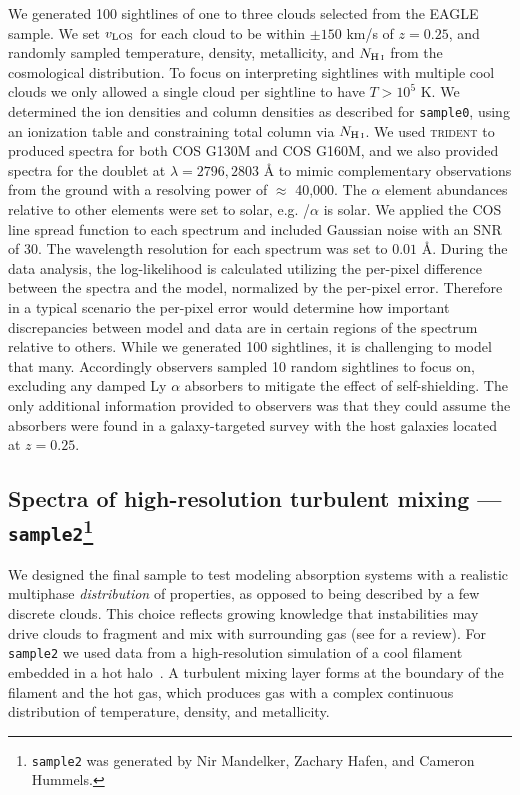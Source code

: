 \documentclass[fleqn,usenatbib]{mnras}
\begin{document}
We generated 100 sightlines of one to three clouds selected from the EAGLE sample.
We set $v_{\rm LOS}$ for each cloud to be within $\pm150$ km/s of $z=0.25$, and randomly sampled temperature, density, metallicity, and $N_{\ion{H}{I}}$ from the cosmological distribution.
To focus on interpreting sightlines with multiple cool clouds we only allowed a single cloud per sightline to have $T>10^5$ K.
We determined the ion densities and column densities as described for \texttt{sample0}, using an ionization table and constraining total column via $N_{\ion{H}{I}}$.
We used \textsc{trident} to produced spectra for both COS G130M and COS G160M, and we also provided spectra for the  doublet at $\lambda = 2796, 2803$ {\AA} to mimic complementary observations from the ground with a resolving power of $\approx$ 40,000.
The $\alpha$ element abundances relative to other elements were set to solar, e.g. /$\alpha$ is solar.
We applied the COS line spread function to each spectrum and included Gaussian noise with an SNR of 30.
The wavelength resolution for each spectrum was set to $0.01$ \AA.
During the data analysis, the log-likelihood is calculated utilizing the per-pixel difference between the spectra and the model, normalized by the per-pixel error.
Therefore in a typical scenario the per-pixel error would determine how important discrepancies between model and data are in certain regions of the spectrum relative to others.
While we generated 100 sightlines, it is challenging to model that many.
Accordingly observers sampled 10 random sightlines to focus on, excluding any damped Ly $\alpha$ absorbers to mitigate the effect of self-shielding.
The only additional information provided to observers was that they could assume the absorbers were found in a galaxy-targeted survey with the host galaxies located at $z=0.25$.

\subsection[Spectra of high-resolution turbulent mixing --- \texttt{sample2}]{Spectra of high-resolution turbulent mixing --- \texttt{sample2}\footnote{
\texttt{sample2} was generated by Nir Mandelker, Zachary Hafen, and Cameron Hummels.}}
\label{s: data generation -- sample2}

We designed the final sample to test modeling absorption systems with a realistic multiphase \textit{distribution} of properties, as opposed to being described by a few discrete clouds.
This choice reflects growing knowledge that instabilities may drive clouds to fragment and mix with surrounding gas (see \citealt{faucher-giguere2023Key} for a review).
For \texttt{sample2} we used data from a high-resolution simulation of a cool filament embedded in a hot halo~\citep{mandelker2020Instability}.
A turbulent mixing layer forms at the boundary of the filament and the hot gas, which produces gas with a complex continuous distribution of temperature, density, and metallicity.
\end{document}
